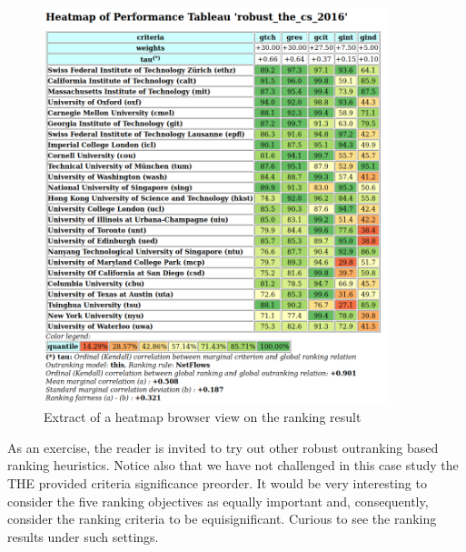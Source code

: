 \begin{figure}[h]
\includegraphics[width=10cm]{Figures/theHeatmap.png}
\caption{Extract of a heatmap browser view on the \NetFlows ranking result}
\label{fig:13.4}       %
\end{figure}

As an exercise, the reader is invited to try out other robust outranking based ranking heuristics. Notice also that we have not challenged in this case study the THE provided criteria significance preorder. It would be very interesting to consider the five ranking objectives as equally important and, consequently, consider the ranking criteria to be equisignificant. Curious to see the ranking results under such settings.
 
\clearpage


%